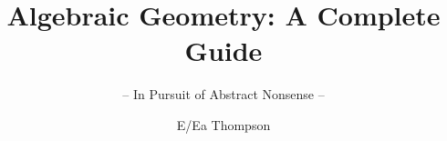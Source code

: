 \documentclass[graybox,envcountchap,sectrefs]{style/svmono}
\begin{document}
\author{E/Ea Thompson}
\title{Algebraic Geometry: A Complete Guide}
\subtitle{-- In Pursuit of Abstract Nonsense --}
\maketitle

\frontmatter%

%
%

%

\tableofcontents

%


\mainmatter%














































\backmatter%
%
%
%
\printindex

\end{document}
